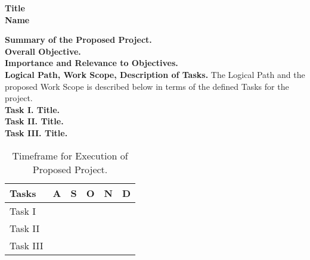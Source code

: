 \documentclass[11pt,a4paper]{article}
\begin{document}
\begin{center}\textbf{Title \\ Name}\end{center}

\noindent\textbf{Summary of the Proposed Project.} 
\\

\noindent\textbf{Overall Objective.}
\\

\noindent\textbf{Importance and Relevance to Objectives.}
\\

\noindent\textbf{Logical Path, Work Scope, Description of Tasks.} The Logical Path and the proposed Work Scope is described below in terms of the defined Tasks for the project.
\\

\noindent\textbf{Task I. Title.}
\\

\noindent\textbf{Task II. Title.}
\\

\noindent\textbf{Task III. Title.}
\\

\begin{table}[h!]
    \centering
    \caption{Timeframe for Execution of Proposed Project.}
    \begin{tabular}{|l|l|l|l|l|l|}
        \hline
        \textbf{Tasks} & \textbf{A} & \textbf{S} & \textbf{O} & \textbf{N} & \textbf{D} \\
        \hline
        Task I & & & & & \\
        \hline
        Task II & & & & & \\
        \hline
        Task III & & & & & \\
        \hline
    \end{tabular}
    \label{table:timeframe}
\end{table}

%
%
\end{document}
